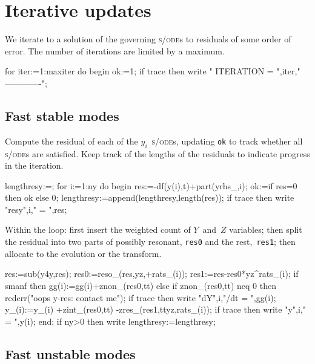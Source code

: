 \documentclass[11pt,a5paper]{article}
\def\sde{\textsc{s/ode}}
\begin{document}
\section{Iterative updates}

We iterate to a solution of the governing \sde{}s to
residuals of some order of error. The number of iterations
are limited by a maximum.
\begin{reduce}
for iter:=1:maxiter do begin
  ok:=1;
  if trace then write "
  ITERATION = ",iter,"
  -------------";
\end{reduce}



\subsection{Fast stable modes}

Compute the residual of each of the $y_i$~\sde{}s, updating
\verb|ok| to track whether all \sde{}s are satisfied.  Keep
track of the lengths of the residuals to indicate progress
in the iteration.
\begin{reduce}
  lengthresy:={};
  for i:=1:ny do begin  
    res:=-df(y(i),t)+part(yrhs_,i);
    ok:=if res=0 then ok else 0;
    lengthresy:=append(lengthresy,{length(res)});
    if trace then write "resy",i," = ",res;
\end{reduce}
Within the loop: first insert the weighted count of
$Y$~and~$Z$ variables; then split the residual into two
parts of possibly resonant, \verb|res0| and the
rest,~\verb|res1|; then allocate to the evolution or the
transform.
\begin{reduce}
    res:=sub(y4y,res);
    res0:=reso_(res,yz,+rats_(i));
    res1:=res-res0*yz^rats_(i);
    if smanf then gg(i):=gg(i)+znon_(res0,tt)
    else if znon_(res0,tt) neq 0 
        then rederr("oops y-res: contact me");
    if trace then write "dY",i,"/dt = ",gg(i);
    y_(i):=y_(i) +zint_(res0,tt) -zres_(res1,ttyz,rats_(i));
    if trace then write "y",i," = ",y(i);
  end;
  if ny>0 then write lengthresy:=lengthresy;
\end{reduce}



\subsection{Fast unstable modes}
\end{document}
